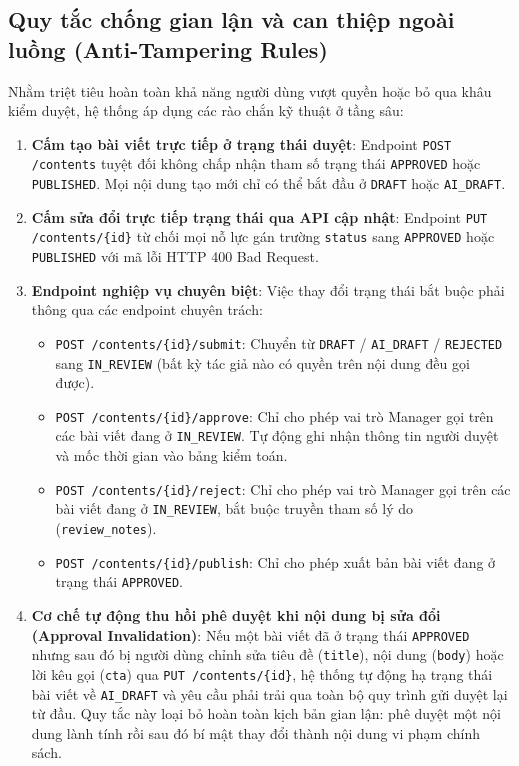 \subsection{Quy tắc chống gian lận và can thiệp ngoài luồng (Anti-Tampering Rules)}
Nhằm triệt tiêu hoàn toàn khả năng người dùng vượt quyền hoặc bỏ qua khâu kiểm duyệt, hệ thống áp dụng các rào chắn kỹ thuật ở tầng sâu:
\begin{enumerate}
  \item \textbf{Cấm tạo bài viết trực tiếp ở trạng thái duyệt}: Endpoint \texttt{POST /contents} tuyệt đối không chấp nhận tham số trạng thái \texttt{APPROVED} hoặc \texttt{PUBLISHED}. Mọi nội dung tạo mới chỉ có thể bắt đầu ở \texttt{DRAFT} hoặc \texttt{AI\_DRAFT}.
  \item \textbf{Cấm sửa đổi trực tiếp trạng thái qua API cập nhật}: Endpoint \texttt{PUT /contents/\{id\}} từ chối mọi nỗ lực gán trường \texttt{status} sang \texttt{APPROVED} hoặc \texttt{PUBLISHED} với mã lỗi HTTP 400 Bad Request.
  \item \textbf{Endpoint nghiệp vụ chuyên biệt}: Việc thay đổi trạng thái bắt buộc phải thông qua các endpoint chuyên trách:
    \begin{itemize}
      \item \texttt{POST /contents/\{id\}/submit}: Chuyển từ \texttt{DRAFT} / \texttt{AI\_DRAFT} / \texttt{REJECTED} sang \texttt{IN\_REVIEW} (bất kỳ tác giả nào có quyền trên nội dung đều gọi được).
      \item \texttt{POST /contents/\{id\}/approve}: Chỉ cho phép vai trò Manager gọi trên các bài viết đang ở \texttt{IN\_REVIEW}. Tự động ghi nhận thông tin người duyệt và mốc thời gian vào bảng kiểm toán.
      \item \texttt{POST /contents/\{id\}/reject}: Chỉ cho phép vai trò Manager gọi trên các bài viết đang ở \texttt{IN\_REVIEW}, bắt buộc truyền tham số lý do (\texttt{review\_notes}).
      \item \texttt{POST /contents/\{id\}/publish}: Chỉ cho phép xuất bản bài viết đang ở trạng thái \texttt{APPROVED}.
    \end{itemize}
  \item \textbf{Cơ chế tự động thu hồi phê duyệt khi nội dung bị sửa đổi (Approval Invalidation)}: Nếu một bài viết đã ở trạng thái \texttt{APPROVED} nhưng sau đó bị người dùng chỉnh sửa tiêu đề (\texttt{title}), nội dung (\texttt{body}) hoặc lời kêu gọi (\texttt{cta}) qua \texttt{PUT /contents/\{id\}}, hệ thống tự động hạ trạng thái bài viết về \texttt{AI\_DRAFT} và yêu cầu phải trải qua toàn bộ quy trình gửi duyệt lại từ đầu. Quy tắc này loại bỏ hoàn toàn kịch bản gian lận: phê duyệt một nội dung lành tính rồi sau đó bí mật thay đổi thành nội dung vi phạm chính sách.
\end{enumerate}

